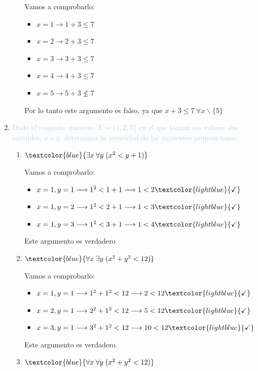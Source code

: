 \documentclass{article}
\newcommand{\lb}[1]{\textcolor{lightblue}{#1}}
\newcommand{\db}[1]{\textcolor{blue}{#1}}
\begin{document}
\begin{enumerate}[label=\color{red}\textbf{\arabic*)}, leftmargin=*]
\begin{enumerate}[label=\color{red}\alph*)]
            Vamos a comprobarlo:
            \begin{itemize}[label=$-$]
                  \item $x=1\longrightarrow 1+3\le7$
                  \item $x=2\longrightarrow 2+3\le7$
                  \item $x=3\longrightarrow 3+3\le7$
                  \item $x=4\longrightarrow 4+3\le7$
                  \item $x=5\longrightarrow 5+3\nleq7$
            \end{itemize}
            Por lo tanto este argumento es falso, ya que $x+3\le 7\:\forall x\backslash\{5\}$
      \end{enumerate}
      \item \lb{Dado el conjunto universo $X=\{1,2,3\}$ en el que toman sus valores dos variables, $x$ e $y$, determinar la veracidad de las siguientes proposiciones:}
      \begin{enumerate}[label=\color{red}\alph*)]
            \item $\db{\exists x\:\forall y\;(x^2<y+1)}$
            
            Vamos a comprobarlo:
            \begin{itemize}[label=$-$]
            \item $x=1, y=1\longrightarrow 1^2<1+1\longrightarrow1<2 \lb{\checkmark}$
            \item $x=1, y=2\longrightarrow 1^2<2+1\longrightarrow 1<3\lb{\checkmark}$
            \item $x=1,y=3\longrightarrow 1^2<3+1\longrightarrow1<4\lb{\checkmark}$
            \end{itemize}
            Este argumento es verdadero
            \item $\db{\forall x\:\exists y\;(x^2+y^2<12)}$
            
            Vamos a comprobarlo:
            \begin{itemize}[label*=$-$]
            \item $x=1,y=1\longrightarrow 1^2+1^2<12\longrightarrow 2<12\lb{\checkmark}$
            \item $x=2,y=1\longrightarrow 2^2+1^2<12\longrightarrow 5<12\lb{\checkmark}$
            \item $x=3,y=1\longrightarrow 3^2+1^2<12\longrightarrow10<12\lb{\checkmark}$
            \end{itemize}
            Este argumento es verdadero.
            \item $\db{\forall x\:\forall y\;(x^2+y^2<12)}$
            

\end{enumerate}
\end{enumerate}
\end{document}
